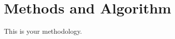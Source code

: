 \documentclass[Thesis.tex]{subfiles}
\begin{document}
\setcounter{section}{1}

\section{Methods and Algorithm}
\label{sec:met}

This is your methodology.
      
      
\end{document}

